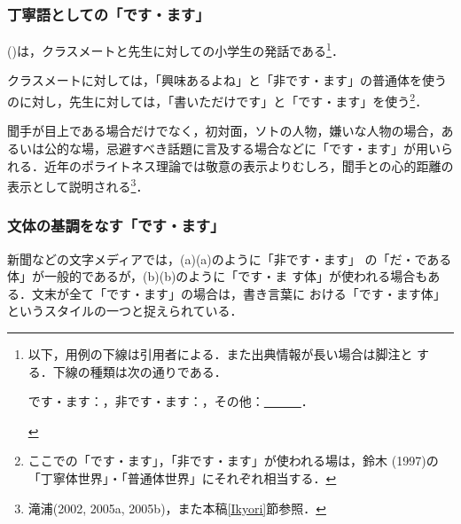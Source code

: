 \documentclass[japanese]{jnlp_1.3c}
\begin{document}
\subsubsection{丁寧語としての「です・ます」}

()は，クラスメートと先生に対しての小学生の発話である\footnote{
	以下，用例の下線は引用者による．また出典情報が長い場合は脚注と
	する．下線の種類は次の通りである．
	\begin{list}{}{}
	 \item  です・ます：\unami{　　　}，非です・ます：\utensen{　　　}，その他：\ul{　　　}．
	\end{list}}．


クラスメートに対しては，「興味あるよね」と「非です・ます」の普通体を使う
のに対し，先生に対しては，「書いただけです」と「です・ます」を使う\footnote{
	ここでの「です・ます」，「非です・ます」が使われる場は，鈴木
	(1997)の「丁寧体世界」・「普通体世界」にそれぞれ相当する．}．

聞手が目上である場合だけでなく，初対面，ソトの人物，嫌いな人物の場合，あ
るいは公的な場，忌避すべき話題に言及する場合などに「です・ます」が用いら
れる．近年のポライトネス理論では敬意の表示よりむしろ，聞手との心的距離の
表示として説明される\footnote{
	滝浦(2002, 2005a, 2005b)，また本稿\ref{Ikyori}節参照．}．

\subsubsection{文体の基調をなす「です・ます」}

新聞などの文字メディアでは，(a)(a)のように「非です・ます」
の「だ・である体」が一般的であるが，(b)(b)のように「です・ま
す体」が使われる場合もある．文末が全て「です・ます」の場合は，書き言葉に
おける「です・ます体」というスタイルの一つと捉えられている．
\end{document}
